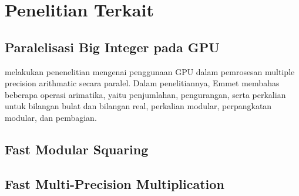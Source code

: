 \section{Penelitian Terkait}
\subsection{Paralelisasi Big Integer pada GPU}
\citet{gpu_bignum} melakukan penenelitian mengenai penggunaan GPU dalam pemrosesan multiple precision arithmatic secara paralel. Dalam penelitiannya, Emmet membahas beberapa operasi arimatika, yaitu penjumlahan, pengurangan, serta perkalian untuk bilangan bulat dan bilangan real, perkalian modular, perpangkatan modular, dan pembagian.



\subsection{Fast Modular Squaring}
\citep{drucker_gueron_2019}

\subsection{Fast Multi-Precision Multiplication}
\citep{hutter_wenger_2018}


